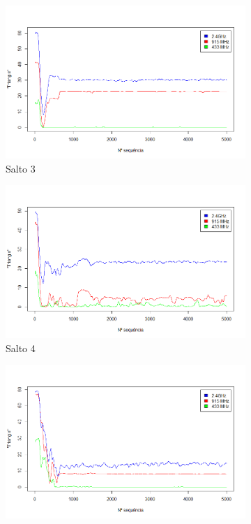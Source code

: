 \documentclass[
	12pt,				%
	openright,			%
	oneside,
	a4paper,			%
	english,			%
	french,				%
	spanish,			%
	brazil				%
	]{abntex2}
\begin{document}
\begin{figure}[htb]
\begin{subfigure}{.5\textwidth}
		\centering
		\includegraphics[width=.98\linewidth]{TRNG_Salto3}
		\captionsetup{width=.9\textwidth}
		\caption{Salto 3}
		\label{trng_no_opt_s3}
	\end{subfigure}%
	\begin{subfigure}{.5\textwidth}
		\centering
		\includegraphics[width=.98\linewidth]{TRNG_Salto4}
		\captionsetup{width=.9\textwidth}
		\caption{Salto 4}
		\label{trng_no_opt_s4}
	\end{subfigure}
	\begin{subfigure}{.5\textwidth}
		\centering
		\includegraphics[width=.98\linewidth]{TRNG_Salto5}

\end{subfigure}
\end{figure}
\end{document}
